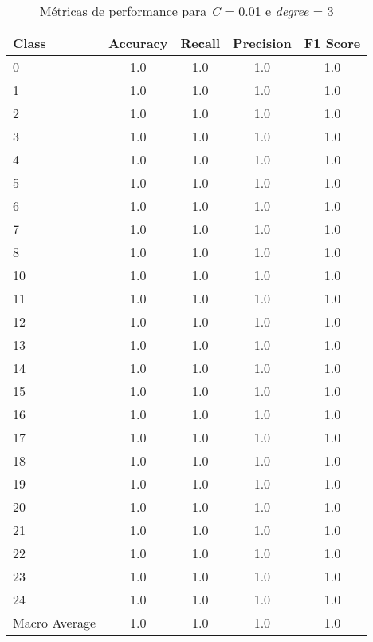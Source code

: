 \begin{table}[!htp]
\caption{Métricas de performance para \textit{C} = 0.01 e \textit{degree} = 3 }
\begin{center}
\begin{tabular}{l c c c c}
Class & Accuracy & Recall & Precision & F1 Score\\ \hline
0 & 1.0 & 1.0 & 1.0 & 1.0\\
1 & 1.0 & 1.0 & 1.0 & 1.0\\
2 & 1.0 & 1.0 & 1.0 & 1.0\\
3 & 1.0 & 1.0 & 1.0 & 1.0\\
4 & 1.0 & 1.0 & 1.0 & 1.0\\
5 & 1.0 & 1.0 & 1.0 & 1.0\\
6 & 1.0 & 1.0 & 1.0 & 1.0\\
7 & 1.0 & 1.0 & 1.0 & 1.0\\
8 & 1.0 & 1.0 & 1.0 & 1.0\\
10 & 1.0 & 1.0 & 1.0 & 1.0\\
11 & 1.0 & 1.0 & 1.0 & 1.0\\
12 & 1.0 & 1.0 & 1.0 & 1.0\\
13 & 1.0 & 1.0 & 1.0 & 1.0\\
14 & 1.0 & 1.0 & 1.0 & 1.0\\
15 & 1.0 & 1.0 & 1.0 & 1.0\\
16 & 1.0 & 1.0 & 1.0 & 1.0\\
17 & 1.0 & 1.0 & 1.0 & 1.0\\
18 & 1.0 & 1.0 & 1.0 & 1.0\\
19 & 1.0 & 1.0 & 1.0 & 1.0\\
20 & 1.0 & 1.0 & 1.0 & 1.0\\
21 & 1.0 & 1.0 & 1.0 & 1.0\\
22 & 1.0 & 1.0 & 1.0 & 1.0\\
23 & 1.0 & 1.0 & 1.0 & 1.0\\
24 & 1.0 & 1.0 & 1.0 & 1.0\\
\hline
Macro Average & 1.0 & 1.0 & 1.0 & 1.0\\
\end{tabular}
\label{tab: poly_perfomance}
\end{center}
\end{table}

